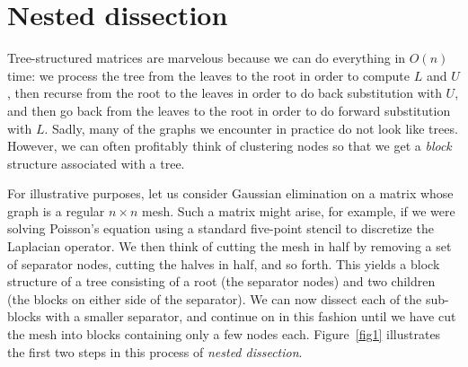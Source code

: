 \section{Nested dissection}

Tree-structured matrices are marvelous because we can do everything in
$O(n)$ time: we process the tree from the leaves to the root in order
to compute $L$ and $U$, then recurse from the root to the leaves in
order to do back substitution with $U$, and then go back from the
leaves to the root in order to do forward substitution with $L$.
Sadly, many of the graphs we encounter in practice do not look like trees.
However, we can often profitably think of clustering nodes so that we get
a {\em block} structure associated with a tree.

For illustrative purposes, let us consider Gaussian elimination on a
matrix whose graph is a regular $n \times n$ mesh.  Such a matrix
might arise, for example, if we were solving Poisson's equation using
a standard five-point stencil to discretize the Laplacian operator.
We then think of cutting the mesh in half by removing a set of
separator nodes, cutting the halves in half, and so forth.  This
yields a block structure of a tree consisting of a root (the separator
nodes) and two children (the blocks on either side of the separator).
We can now dissect each of the sub-blocks with a smaller separator,
and continue on in this fashion until we have cut the mesh into blocks
containing only a few nodes each.  Figure~\ref{fig1} illustrates the
first two steps in this process of {\em nested dissection}.

